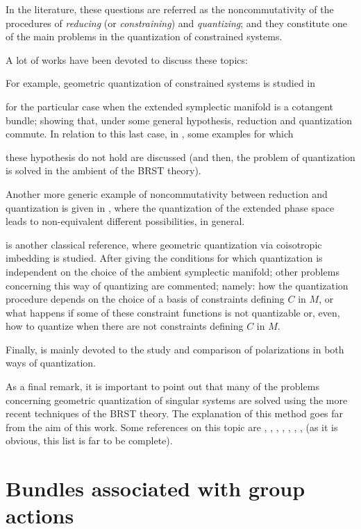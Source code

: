 \documentclass[12pt]{article}
\begin{document}
In the literature, these questions are referred as the
noncommutativity of the procedures of
{\it reducing} (or {\it constraining}) and {\it quantizing};
and they constitute one of the main problems in the quantization of
constrained systems.

A lot of works have been devoted to discuss these topics:

For example, geometric quantization of constrained systems is studied in

\cite{Go-86}
for the particular case when the extended symplectic manifold
is a cotangent bundle;
showing that, under some general hypothesis, reduction and quantization
commute.
In relation to this last case, in \cite{DET-90}, some examples for which

these
hypothesis do not hold are discussed (and then, the problem
of quantization is solved in the ambient of the BRST theory).

Another more generic example of noncommutativity between reduction and
quantization
is given in \cite{Lo-90}, where the quantization of the extended phase
space
leads to non-equivalent different possibilities, in general.

\cite{GS-81} is another classical reference, where geometric
quantization via
coisotropic imbedding is studied. After giving the conditions for which
quantization is independent on the choice of the ambient symplectic
manifold;
other problems concerning this way of quantizing are commented;
namely: how the quantization procedure depends on the choice of a basis
of constraints
defining $C$ in $M$, or what happens if some of these constraint
functions is not quantizable or, even, how to quantize when there are
not
constraints defining $C$ in $M$.

Finally, \cite{AS-86} is mainly devoted to the study and comparison of
polarizations in both ways of quantization.

As a final remark, it is important to point out that many of the
problems concerning geometric quantization of singular systems
are solved using the more recent techniques of the
BRST theory. The explanation of this method goes far from the aim
of this work. Some references on this topic are
\cite{ALN-90}, \cite{ALN-91}, \cite{DEGST-91}, \cite{Ib-90},
\cite{Ko-77}, \cite{Lo-92},
\cite{Tu-92a}, \cite{Tu-92b} (as it is obvious, this list is far to be
complete).




\appendix


\section{Bundles associated with group actions}
\end{document}
